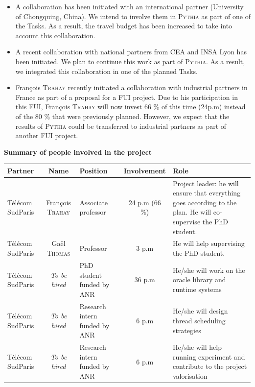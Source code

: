 \documentclass[a4paper,11pt,defblank]{article}
\newcommand{\pname}{\textsc{Pythia}\xspace}
\begin{document}
\begin{itemize}
\item A collaboration has been initiated with an international partner
  (University of Chongquing, China). We intend to involve them in
  \pname as part of one of the Tasks. As a result, the travel budget
  has been increased to take into account this collaboration.

\item A recent collaboration with national partners from CEA and INSA
  Lyon has been initiated. We plan to continue this work as part of
  \pname. As a result, we integrated this collaboration in one of the
  planned Tasks.

\item François \textsc{Trahay} recently initiated a collaboration with
  industrial partners in France as part of a proposal for a FUI
  project. Due to his participation in this FUI, François \textsc{Trahay} will now
  invest 66 \% of this time (24p.m) instead of the 80 \% that were
  previously planned. However, we expect that the results of \pname
  could be transferred to industrial partners as part of another FUI
  project.
\end{itemize}

\textbf{Summary of people involved in the project}
\begin{center}
 \begin{tabularx}{\linewidth} {|p{17mm}|c|p{30mm}|c|L|}\hline
   Partner& Name & Position & Involvement & Role\\\hline Télécom SudParis
   & François \textsc{Trahay} & Associate professor & 24 p.m (66 \%) &
   Project leader: he will ensure that everything goes according to the
   plan. He will co-supervise the PhD student.\\\hline

    Télécom SudParis& Gaël \textsc{Thomas} & Professor& 3 p.m &He will
    help supervising the PhD student.\\\hline

    Télécom SudParis& \emph{To be hired} & PhD student funded by ANR &
    36 p.m & He/she will work on the oracle library and runtime
    systems \\\hline

    Télécom SudParis& \emph{To be hired} & Research intern funded by
    ANR & 6 p.m &He/she will design thread scheduling
    strategies\\\hline

    Télécom SudParis& \emph{To be hired} & Research intern funded by ANR& 6 p.m
    & He/she will help running experiment and contribute to the
    project valorisation\\\hline
 \end{tabularx}
\end{center}
\end{document}
